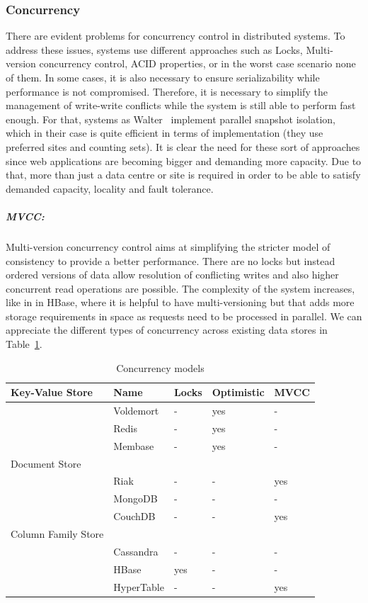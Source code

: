 	\subsubsection{Concurrency}
	There are evident problems for concurrency control in distributed systems. To address these issues, systems use different approaches such as Locks, Multi-version concurrency control, ACID properties, or in the worst case scenario none of them. In some cases, it is also necessary to ensure serializability while performance is not compromised. Therefore, it is necessary to simplify the management of write-write conflicts while the system is still able to perform fast enough. For that, systems as Walter~\cite{Sovran:2011} implement parallel snapshot isolation, which in their case is quite efficient in terms of implementation (they use preferred sites and counting sets). It is clear the need for these sort of approaches since web applications are becoming bigger and demanding more capacity. Due to that, more than just a data centre or site is required in order to be able to satisfy demanded capacity, locality and fault tolerance.
	
		\subparagraph{MVCC:}
		Multi-version concurrency control aims at simplifying the stricter model of consistency to provide a better performance. There are no locks but instead ordered versions of data allow resolution of conflicting writes and also higher concurrent read operations are possible. The complexity of the system increases, like in in HBase, where it is helpful to have multi-versioning but that adds more storage requirements in space as requests need to be processed in parallel. We can appreciate the different types of concurrency across existing data stores in Table~\ref{table:concurrency}.
		
		\begin{table}[b]
		\begin{center}
    			\begin{tabular}{ | p{5cm} | l | l | l | l |}
   			\hline
			Key-Value Store & Name & Locks & Optimistic & MVCC \\ \hline   		
			 & Voldemort & - & yes & - \\ \hline
			 & Redis & - & yes & - \\ \hline
			 & Membase & 	- & yes & - \\ \hline
			
			Document Store &  &  &  &  \\ \hline
			 & Riak & - & - & yes \\ \hline			
			 & MongoDB & - & - & - \\ \hline
			 & CouchDB & - & - & yes \\ \hline
			Column Family Store &  &  &  &  \\ \hline
			 & Cassandra & - & - & - \\ \hline
			 & HBase & yes & - & - \\ \hline
			 & HyperTable & - & - & yes \\ \hline
    			\end{tabular}
		\end{center}
		\caption{Concurrency models}
		\label{table:concurrency}
		\end{table}		
	
